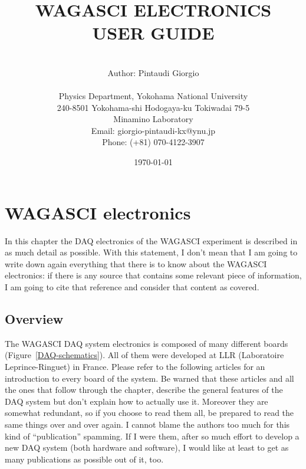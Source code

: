 \title{WAGASCI ELECTRONICS\\USER GUIDE}
\author{\\Author: Pintaudi Giorgio\\\\
  Physics Department, Yokohama National University\\
  240-8501 Yokohama-shi Hodogaya-ku Tokiwadai 79-5\\ %
  Minamino Laboratory\\
  Email: giorgio-pintaudi-kx@ynu.jp\\
  Phone: (+81) 070-4122-3907\\} \date{\today}
\maketitle
\newpage

\tableofcontents\label{c}
\newpage


\chapter{WAGASCI electronics}
In this chapter the DAQ electronics of the WAGASCI experiment is described in as
much detail as possible. With this statement, I don't mean that I am going to
write down again everything that there is to know about the WAGASCI electronics:
if there is any source that contains some relevant piece of information, I am
going to cite that reference and consider that content as covered.

\section{Overview}\label{sec:overview}
The WAGASCI DAQ system electronics is composed of many different boards
(Figure~\ref{DAQ-schematics}). All of them were developed at LLR (Laboratoire
Leprince-Ringuet) in France. Please refer to the following articles for an
introduction to every board of the
system\cite{Gastaldi:2014vaa,Gastaldi:2014oid}.  Be warned that these articles
and all the ones that follow through the chapter, describe the general features
of the DAQ system but don't explain how to actually use it. Moreover they are
somewhat redundant, so if you choose to read them all, be prepared to read the
same things over and over again. I cannot blame the authors too much for this
kind of ``publication'' spamming. If I were them, after so much effort to
develop a new DAQ system (both hardware and software), I would like at least to
get as many publications as possible out of it, too.

